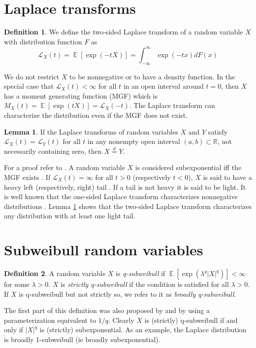 \documentclass{article}
\theoremstyle{definition}
\newtheorem{definition}{Definition}[section]
\newtheorem{lemma}{Lemma}[theorem]
\DeclareMathOperator{\E}{\mathbb{E}}
\begin{document}
\section{Laplace transforms}
\begin{definition}
\label{def:laplace-transform}
We define the two-sided Laplace transform of a random variable $X$ with distribution function $F$ as
\[\mathcal{L}_X(t)= \E[\exp(-tX)]=\int_{-\infty}^\infty \exp(-tx)dF(x)\]
\end{definition}
We do not restrict $X$ to be nonnegative or to have a density function. In the special case that $\mathcal{L}_X(t)<\infty$ for all $t$ in an open interval around $t=0$, then $X$ has a moment generating function (MGF) which is $M_X(t)= \E[\exp(tX)]=\mathcal{L}_X(-t)$. The Laplace transform can characterize the distribution even if the MGF does not exist.
\begin{lemma}
\label{lem:laplace-unique}
If the Laplace transforms of random variables $X$ and $Y$ satisfy $\mathcal{L}_X(t) = \mathcal{L}_Y(t)$ for all $t$ in any nonempty open interval $(a,b)\subset \mathbb{R}$, not necessarily containing zero, then $X\overset{d}{=} Y$. 
\end{lemma}
For a proof refer to \cite{mukherjeaNoteMomentGenerating2006}. A random variable $X$ is considered subexponential iff the MGF exists \cite{vershyninHighDimensionalProbabilityIntroduction2018}.  
If $\mathcal{L}_X(t)=\infty$ for all $t>0$ (respectively $t<0$), $X$ is said to have a heavy left (respectively, right) tail \cite{nairFundamentalsHeavyTails2022}. If a tail is not heavy it is said to be light. It is well known that the one-sided Laplace transform characterizes nonnegative distributions \cite{fellerIntroductionProbabilityTheory1971}. Lemma \ref{lem:laplace-unique} shows that the two-sided Laplace transform characterizes any distribution with at least one light tail. 

\section{Subweibull random variables}

\begin{definition}
\label{def:subweibull}
A random variable $X$ is \textit{q-subweibull} if $\E[\exp(\lambda^q \vert X\vert^q)]<\infty$ for some $\lambda>0$. $X$ is \textit{strictly q-subweibull} if the condition is satisfied for all $\lambda>0$. 
If $X$ is q-subweibull but not strictly so, we refer to it as \textit{broadly q-subweibull}. 
\end{definition}
The first part of this definition was also proposed by \cite{kuchibhotlaMovingSubGaussianityHighdimensional2022} and by \cite{vladimirovaSubWeibullDistributionsGeneralizing2020} using a parameterization equivalent to $1/q$. Clearly $X$ is (strictly) q-subweibull if and only if $\vert X\vert^q$ is (strictly) subexponential. As an example, the Laplace distribution is broadly 1-subweibull (ie broadly subexponential).
\end{document}
